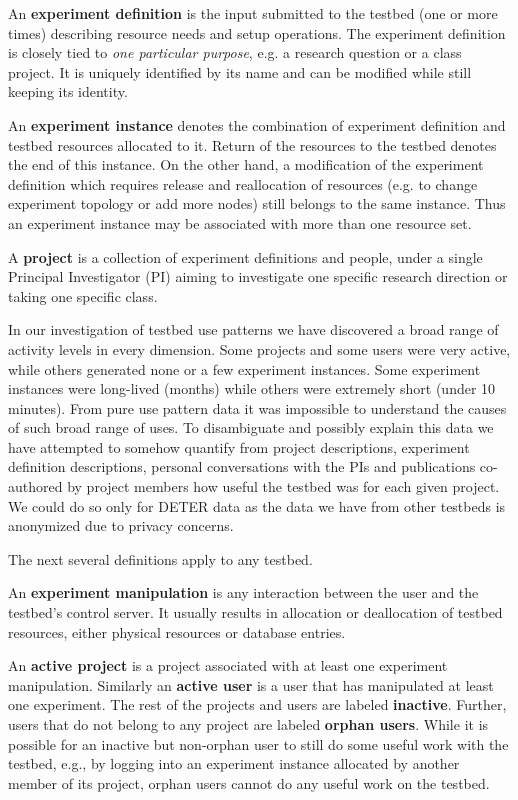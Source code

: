 An \textbf{experiment definition} is the input submitted to the testbed
(one or more times) describing resource needs and setup operations. The
experiment definition is closely tied to \textit{one particular
purpose}, e.g. a research question or a class project. It is uniquely
identified by its name and can be modified while still keeping its
identity.

An \textbf{experiment instance} denotes the combination of experiment
definition and testbed resources allocated to it. Return of the
resources to the testbed denotes the end of this instance. On the other
hand, a modification of the experiment definition which requires release
and reallocation of resources (e.g. to change experiment topology or add
more nodes) still belongs to the same instance. Thus an experiment
instance may be associated with more than one resource set.

A \textbf{project} is a collection of experiment definitions and people,
under a single Principal Investigator (PI) aiming to investigate one
specific research direction or taking one specific class.


In our investigation of testbed use patterns we have discovered a broad
range of activity levels in every dimension. Some projects and some
users were very active, while others generated none or a few experiment
instances. Some experiment instances were long-lived (months) while
others were extremely short (under 10 minutes). From pure use pattern
data it was impossible to understand the causes of such broad range of
uses. To disambiguate and possibly explain this data we have attempted
to somehow quantify from project descriptions, experiment definition
descriptions, personal conversations with the PIs and publications
co-authored by project members how useful the testbed was for each given
project. We could do so only for DETER data as the data we have from
other testbeds is anonymized due to privacy concerns.

The next several definitions apply to any testbed.

An \textbf{experiment manipulation} is any interaction between the user
and the testbed's control server. It usually results in allocation or
deallocation of testbed resources, either physical resources or database
entries.

An \textbf{active project} is a project associated with at least one
experiment manipulation. Similarly an \textbf{active user} is a user
that has manipulated at least one experiment. The rest of the projects
and users are labeled \textbf{inactive}. Further, users that do not
belong to any project are labeled \textbf{orphan users}. While it is
possible for an inactive but non-orphan user to still do some useful
work with the testbed, e.g., by logging into an experiment instance
allocated by another member of its project, orphan users cannot do any
useful work on the testbed.

